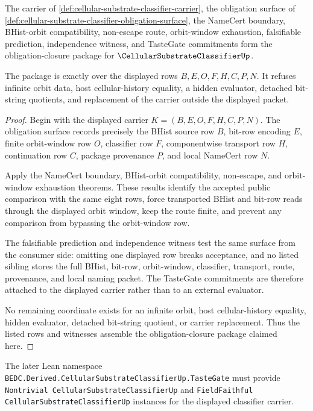 \begin{theorem}
\label{thm:cellular-substrate-classifier-obligation-closure}
The carrier of \autoref{def:cellular-substrate-classifier-carrier}, the obligation surface of \autoref{def:cellular-substrate-classifier-obligation-surface}, the NameCert boundary, BHist-orbit compatibility, non-escape route, orbit-window exhaustion, falsifiable prediction, independence witness, and TasteGate commitments form the obligation-closure package for $\CellularSubstrateClassifierUp$.

The package is exactly over the displayed rows $B,E,O,F,H,C,P,N$. It refuses infinite orbit data, host cellular-history equality, a hidden evaluator, detached bit-string quotients, and replacement of the carrier outside the displayed packet.
\end{theorem}
\begin{proof}
Begin with the displayed carrier $K=(B,E,O,F,H,C,P,N)$. The obligation surface records precisely the BHist source row $B$, bit-row encoding $E$, finite orbit-window row $O$, classifier row $F$, componentwise transport row $H$, continuation row $C$, package provenance $P$, and local NameCert row $N$.

Apply the NameCert boundary, BHist-orbit compatibility, non-escape, and orbit-window exhaustion theorems. These results identify the accepted public comparison with the same eight rows, force transported BHist and bit-row reads through the displayed orbit window, keep the route finite, and prevent any comparison from bypassing the orbit-window row.

The falsifiable prediction and independence witness test the same surface from the consumer side: omitting one displayed row breaks acceptance, and no listed sibling stores the full BHist, bit-row, orbit-window, classifier, transport, route, provenance, and local naming packet. The TasteGate commitments are therefore attached to the displayed carrier rather than to an external evaluator.

No remaining coordinate exists for an infinite orbit, host cellular-history equality, hidden evaluator, detached bit-string quotient, or carrier replacement. Thus the listed rows and witnesses assemble the obligation-closure package claimed here.
\end{proof}

The later Lean namespace \texttt{BEDC.Derived.CellularSubstrateClassifierUp.TasteGate} must provide \texttt{Nontrivial CellularSubstrateClassifierUp} and \texttt{FieldFaithful CellularSubstrateClassifierUp} instances for the displayed classifier carrier.

